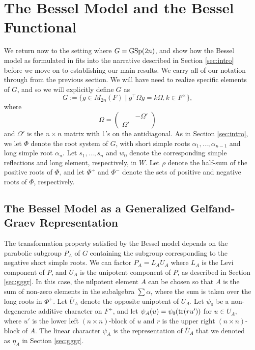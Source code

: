 \documentclass[11pt,letterpaper]{article}
\newcommand{\GSp}{\textup{GSp}}
\newcommand{\Tr}{\textup{tr}}
\theoremstyle{remark}
\numberwithin{equation}{section}
\begin{document}
\section{The Bessel Model and the Bessel Functional} \label{sec:bessel}

We return now to the setting where $G = \GSp(2n)$, and show how the Bessel model as formulated in \cite{NPS} fits into the narrative described in Section \ref{sec:intro} before we move on to establishing our main results. We carry all of our notation through from the previous section. We will have need to realize specific elements of $G$, and so we will explicitly define $G$ as $$G:= \{g \in M_{2n}(F) \mid g^{\top}\Omega g = k\Omega, k \in F^{\times}\},$$ where $$\Omega = \begin{pmatrix} & -\Omega' \\ \Omega' & \end{pmatrix}$$ and $\Omega'$ is the $n\times n$ matrix with 1's on the antidiagonal. As in Section \ref{sec:intro}, we let $\Phi$ denote the root system of $G$, with short simple roots $\alpha_1,\hdots, \alpha_{n-1}$ and long simple root $\alpha_n$. Let $s_1,\hdots, s_n$ and $w_0$ denote the corresponding simple reflections and long element, respectively, in $W$. Let $\rho$ denote the half-sum of the positive roots of $\Phi$, and let $\Phi^+$ and $\Phi^-$ denote the sets of positive and negative roots of $\Phi$, respectively.

\subsection{The Bessel Model as a Generalized Gelfand-Graev Representation} \label{sec:besselmodel}

The transformation property satisfied by the Bessel model depends on the parabolic subgroup $P_A$ of $G$ containing the subgroup corresponding to the negative short simple roots. We can factor $P_A = L_AU_A$ where $L_A$ is the Levi component of $P$, and $U_A$ is the unipotent component of $P$, as described in Section \ref{sec:gggr}. In this case, the nilpotent element $A$ can be chosen so that $A$ is the sum of non-zero elements in the subalgebra $\sum \alpha$, where the sum is taken over the long roots in $\Phi^+$. Let $\overline{U}_A$ denote the opposite unipotent of $U_A$. Let $\psi_0$ be a non-degenerate additive character on $F^+$, and let $\psi_A(u) = \psi_0(\Tr(ru'))$ for $u \in \overline{U}_A$, where $u'$ is the lower left $(n\times n)$-block of $u$ and $r$ is the upper right $(n\times n)$-block of $A$. The linear character $\psi_A$ is the representation of $\overline{U}_A$ that we denoted as $\eta_A$ in Section \ref{sec:gggr}.
\end{document}
